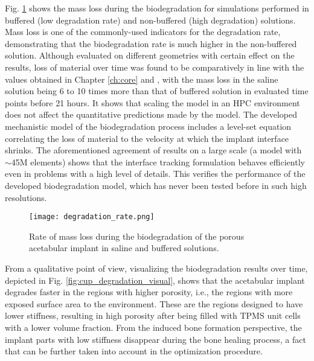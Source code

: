 Fig. \ref{fig:cup_degradation_rate} shows the mass loss during the biodegradation for simulations performed in buffered (low degradation rate) and non-buffered (high degradation) solutions. Mass loss is one of the commonly-used indicators for the degradation rate, demonstrating that the biodegradation rate is much higher in the non-buffered solution. Although evaluated on different geometries with certain effect on the results, loss of material over time was found to be comparatively in line with the values obtained in Chapter \ref{ch:core} and \cite{Barzegari2021}, with the mass loss in the saline solution being 6 to 10 times more than that of buffered solution in evaluated time points before 21 hours.  It shows that scaling the model in an \gls{HPC} environment does not affect the quantitative predictions made by the model. The developed mechanistic model of the biodegradation process includes a level-set equation correlating the loss of material to the velocity at which the implant interface shrinks. The aforementioned agreement of results on a large scale (a model with $\sim$45M elements) shows that the interface tracking formulation behaves efficiently even in problems with a high level of details. This verifies the performance of the developed biodegradation model, which has never been tested before in such high resolutions.

\begin{figure}[h]
\centering
\medskip
\texttt{[image: degradation\_rate.png]}
\caption[Biodegradation rate for the acetabular implant]{Rate of mass loss during the biodegradation of the porous acetabular implant in saline and buffered solutions.} \label{fig:cup_degradation_rate}
\end{figure}

From a qualitative point of view, visualizing the biodegradation results over time, depicted in Fig. \ref{fig:cup_degradation_visual}, shows that the acetabular implant degrades faster in the regions with higher porosity, i.e., the regions with more exposed surface area to the environment. These are the regions designed to have lower stiffness, resulting in high porosity after being filled with \gls{TPMS} unit cells with a lower volume fraction. From the induced bone formation perspective, the implant parts with low stiffness disappear during the bone healing process, a fact that can be further taken into account in the optimization procedure.

